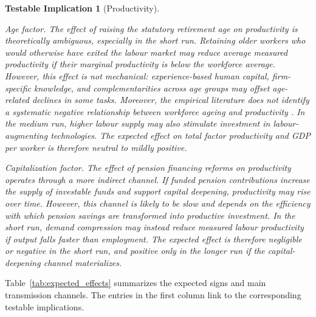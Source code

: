 \documentclass[11pt,english,a4paper, twoside, authoryear]{article}
\newtheorem{testable}{Testable Implication}}
\begin{document}
\begin{testable}[Productivity]\label{test:prod}


\emph{Age factor.} The effect of raising the statutory retirement age on productivity is theoretically ambiguous, especially in the short run. Retaining older workers who would otherwise have exited the labour market may reduce average measured productivity if their marginal productivity is below the workforce average. However, this effect is not mechanical: experience-based human capital, firm-specific knowledge, and complementarities across age groups may offset age-related declines in some tasks. Moreover, the empirical literature does not identify a systematic negative relationship between workforce ageing and productivity \citep{Dai2022}. In the medium run, higher labour supply may also stimulate investment in labour-augmenting technologies. The expected effect on total factor productivity and GDP per worker is therefore neutral to mildly positive.

\emph{Capitalization factor.} The effect of pension financing reforms on productivity operates through a more indirect channel. If funded pension contributions increase the supply of investable funds and support capital deepening, productivity may rise over time. However, this channel is likely to be slow and depends on the efficiency with which pension savings are transformed into productive investment. In the short run, demand compression may instead reduce measured labour productivity if output falls faster than employment. The expected effect is therefore negligible or negative in the short run, and positive only in the longer run if the capital-deepening channel materializes.
\end{testable}


Table~\ref{tab:expected_effects} summarizes the expected signs and main transmission channels. The entries in the first column link to the corresponding testable implications.
\end{document}
